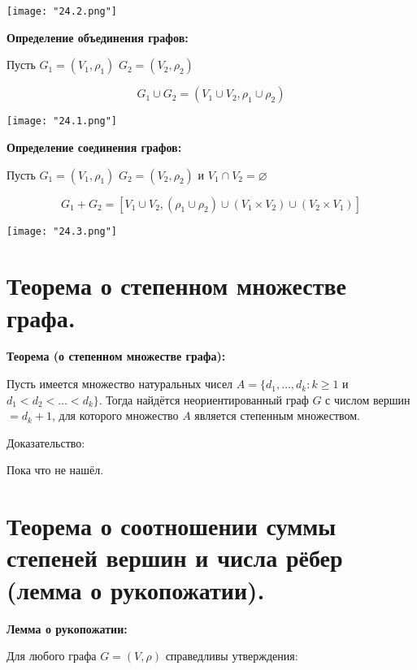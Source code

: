     \begin{center}
        \texttt{[image: "24.2.png"]}
    \end{center}

\textbf{Определение объединения графов:}
    \smallskip
    
    Пусть $G_1 = (V_1, \rho_1)$ $G_2 = (V_2, \rho_2)$

    \[
    G_1 \cup G_2 = (V_1 \cup V_2, \rho_1 \cup \rho_2)
    \]
    \smallskip

    \begin{center}
        \texttt{[image: "24.1.png"]}
    \end{center}

\textbf{Определение соединения графов:}    
    \smallskip

    Пусть $G_1 = (V_1, \rho_1)$ $G_2 = (V_2, \rho_2)$ и $V_1 \cap V_2 = \varnothing$

    \[
        G_1 + G_2 = \left[V_1 \cup V_2, (\rho_1 \cup \rho_2) \cup (V_1 \times V_2)
        \cup (V_2 \times V_1) \right]  
    \]
    \smallskip

    \begin{center}
        \texttt{[image: "24.3.png"]}
    \end{center}

\section{Теорема о степенном множестве графа.}

\textbf{Теорема (о степенном множестве графа):}
    \smallskip

    Пусть имеется множество натуральных чисел $A = \{d_1, \dots, d_k: k \geq 1$ и $
    d_1 < d_2 < \dots < d_k\}$. Тогда найдётся неориентированный граф $G$ с
    числом вершин $= d_k + 1$, для которого множество $A$ является степенным
    множеством.
    \bigskip

    Доказательство:
    \bigskip

    Пока что не нашёл.

\section{Теорема о соотношении суммы степеней вершин и числа рёбер (лемма
о рукопожатии).}

\textbf{Лемма о рукопожатии:}
    \smallskip

    Для любого графа $G = (V, \rho)$ справедливы утверждения:


